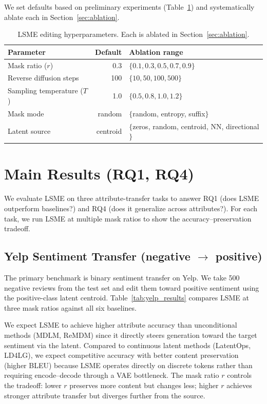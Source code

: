 \documentclass{article}
\begin{document}
We set defaults based on preliminary experiments (Table~\ref{tab:lsme_hparams}) and systematically ablate each in Section~\ref{sec:ablation}.

\begin{table}[h]
\centering
\caption{LSME editing hyperparameters. Each is ablated in Section~\ref{sec:ablation}.}
\label{tab:lsme_hparams}
\begin{tabular}{lrl}
\toprule
\textbf{Parameter} & \textbf{Default} & \textbf{Ablation range} \\
\midrule
Mask ratio ($r$) & 0.3 & $\{0.1, 0.3, 0.5, 0.7, 0.9\}$ \\
Reverse diffusion steps & 100 & $\{10, 50, 100, 500\}$ \\
Sampling temperature ($T$) & 1.0 & $\{0.5, 0.8, 1.0, 1.2\}$ \\
Mask mode & random & $\{$random, entropy, suffix$\}$ \\
Latent source & centroid & $\{$zeros, random, centroid, NN, directional$\}$ \\
\bottomrule
\end{tabular}
\end{table}

\section{Main Results (RQ1, RQ4)}
\label{sec:results}

We evaluate LSME on three attribute-transfer tasks to answer RQ1 (does LSME outperform baselines?) and RQ4 (does it generalize across attributes?). For each task, we run LSME at multiple mask ratios to show the accuracy--preservation tradeoff.

\subsection{Yelp Sentiment Transfer (\texorpdfstring{negative $\to$ positive}{negative to positive})}

The primary benchmark is binary sentiment transfer on Yelp. We take 500 negative reviews from the test set and edit them toward positive sentiment using the positive-class latent centroid. Table~\ref{tab:yelp_results} compares LSME at three mask ratios against all six baselines.

We expect LSME to achieve higher attribute accuracy than unconditional methods (MDLM, ReMDM) since it directly steers generation toward the target sentiment via the latent. Compared to continuous latent methods (LatentOps, LD4LG), we expect competitive accuracy with better content preservation (higher BLEU) because LSME operates directly on discrete tokens rather than requiring encode--decode through a VAE bottleneck. The mask ratio $r$ controls the tradeoff: lower $r$ preserves more content but changes less; higher $r$ achieves stronger attribute transfer but diverges further from the source.
\end{document}
